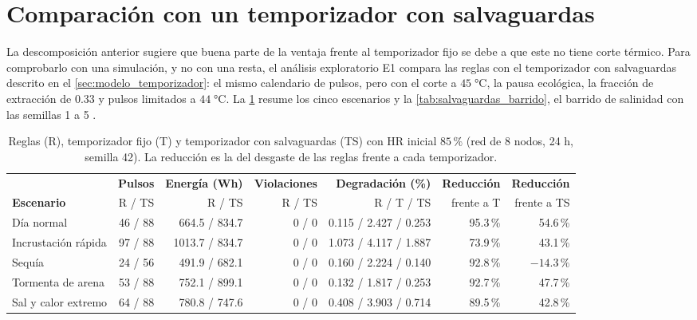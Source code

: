 \section{Comparaci\'on con un temporizador con salvaguardas}
\label{sec:salvaguardas}
La descomposici\'on anterior sugiere que buena parte de la ventaja frente al temporizador fijo se debe a que este no tiene corte t\'ermico. Para comprobarlo con una simulaci\'on, y no con una resta, el an\'alisis exploratorio E1 compara las reglas con el temporizador con salvaguardas descrito en el \cref{sec:modelo_temporizador}: el mismo calendario de pulsos, pero con el corte a $45\;\si{\celsius}$, la pausa ecol\'ogica, la fracci\'on de extracci\'on de 0.33 y pulsos limitados a $44\;\si{\celsius}$. La \cref{tab:salvaguardas} resume los cinco escenarios y la \cref{tab:salvaguardas_barrido}, el barrido de salinidad con las semillas 1 a 5 \parencite[doc.~04, \S~8.13]{axioma2026engine}.

\begin{table}[htbp]
\centering
\footnotesize
\setlength{\tabcolsep}{2pt}
\caption{Reglas (R), temporizador fijo (T) y temporizador con salvaguardas (TS) con HR inicial $85\,\%$ (red de 8 nodos, 24 h, semilla 42). La reducci\'on es la del desgaste de las reglas frente a cada temporizador.}
\label{tab:salvaguardas}
\begin{tabular*}{\textwidth}{@{\extracolsep{\fill}}lrrrrrr@{}}
\toprule
 & \textbf{Pulsos} & \textbf{Energ\'ia (Wh)} & \textbf{Violaciones} & \textbf{Degradaci\'on (\%)} & \textbf{Reducci\'on} & \textbf{Reducci\'on} \\
\textbf{Escenario} & R / TS & R / TS & R / TS & R / T / TS & frente a T & frente a TS \\
\midrule
D\'ia normal & 46 / 88 & 664.5 / 834.7 & 0 / 0 & 0.115 / 2.427 / 0.253 & 95.3\,\% & 54.6\,\% \\
Incrustaci\'on r\'apida & 97 / 88 & 1013.7 / 834.7 & 0 / 0 & 1.073 / 4.117 / 1.887 & 73.9\,\% & 43.1\,\% \\
Sequ\'ia & 24 / 56 & 491.9 / 682.1 & 0 / 0 & 0.160 / 2.224 / 0.140 & 92.8\,\% & $-14.3\,\%$ \\
Tormenta de arena & 53 / 88 & 752.1 / 899.1 & 0 / 0 & 0.132 / 1.817 / 0.253 & 92.7\,\% & 47.7\,\% \\
Sal y calor extremo & 64 / 88 & 780.8 / 747.6 & 0 / 0 & 0.408 / 3.903 / 0.714 & 89.5\,\% & 42.8\,\% \\
\bottomrule
\end{tabular*}
\end{table}

